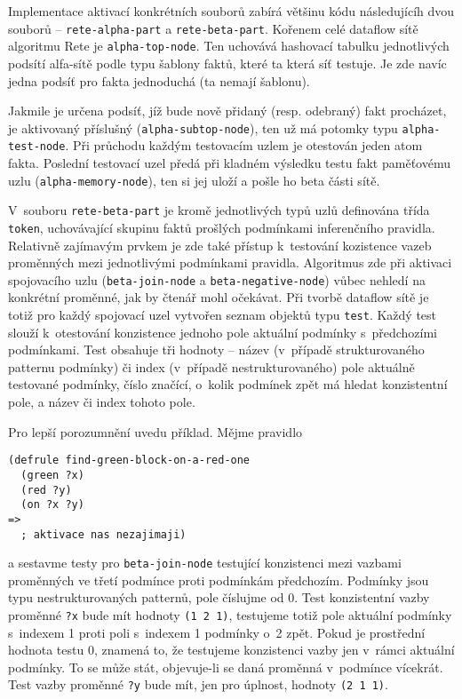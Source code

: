 Implementace aktivací konkrétních souborů zabírá většinu kódu následujícíh dvou
souborů -- \verb|rete-alpha-part| a \verb|rete-beta-part|. Kořenem celé dataflow
sítě algoritmu Rete je \verb|alpha-top-node|. Ten uchovává hashovací tabulku
jednotlivých podsítí alfa-sítě podle typu šablony faktů, které ta která síť
testuje. Je zde navíc jedna podsíť pro fakta jednoduchá (ta nemají šablonu).

Jakmile je určena podsíť, jíž bude nově přidaný (resp. odebraný) fakt procházet,
je aktivovaný příslušný  (\verb|alpha-subtop-node|), ten už má
potomky typu \verb|alpha-test-node|. Při průchodu každým testovacím uzlem je
otestován jeden atom fakta. Poslední testovací uzel předá při kladném výsledku
testu fakt paměťovému uzlu (\verb|alpha-memory-node|), ten si jej uloží
a pošle ho beta části sítě.

V~souboru \verb|rete-beta-part| je kromě jednotlivých typů uzlů definována třída
\verb|token|, uchovávající skupinu faktů prošlých podmínkami inferenčního 
pravidla. Relativně zajímavým prvkem je zde také přístup k~testování  kozistence
vazeb proměnných mezi jednotlivými podmínkami pravidla. Algoritmus zde při
aktivaci spojovacího uzlu (\verb|beta-join-node| a \verb|beta-negative-node|)
vůbec nehledí na konkrétní proměnné, jak by čtenář mohl očekávat. Při tvorbě
dataflow sítě je totiž pro každý spojovací uzel vytvořen seznam objektů typu
\verb|test|. Každý test slouží k~otestování konzistence jednoho pole aktuální
podmínky s~předchozími podmínkami. Test obsahuje tři hodnoty -- název (v~případě
strukturovaného patternu podmínky) či index (v~případě nestrukturovaného)
pole aktuálně testované podmínky, číslo značící, o~kolik podmínek zpět má hledat
konzistentní pole, a název či index tohoto pole.

Pro lepší porozumnění uvedu příklad. Mějme pravidlo
\begin{verbatim}
(defrule find-green-block-on-a-red-one
  (green ?x)
  (red ?y)
  (on ?x ?y)
=>
  ; aktivace nas nezajimaji)
\end{verbatim}
a sestavme testy pro \verb|beta-join-node| testující konzistenci mezi vazbami
proměnných ve třetí podmínce proti podmínkám předchozím. Podmínky jsou typu
nestrukturovaných patternů, pole číslujme od 0. Test konzistentní vazby
proměnné \verb|?x| bude mít hodnoty \verb|(1 2 1)|, testujeme totiž pole
aktuální podmínky s~indexem 1 proti poli s~indexem 1 podmínky o~2 zpět.
Pokud je prostřední hodnota testu 0, znamená to, že testujeme konzistenci vazby
jen v~rámci aktuální podmínky. To se může stát, objevuje-li se daná proměnná
v~podmínce vícekrát. Test vazby proměnné \verb|?y| bude mít, jen pro úplnost,
hodnoty \verb|(2 1 1)|.

